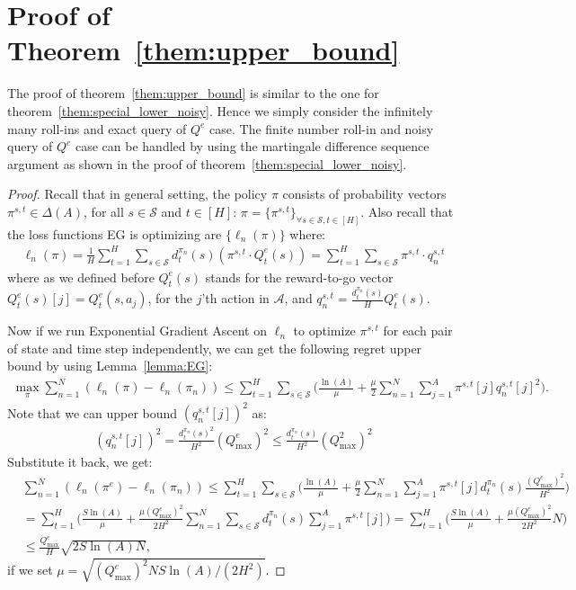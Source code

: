 \documentclass{article}
\begin{document}
\section{Proof of Theorem~\ref{them:upper_bound}}
\label{sec:proof_upper_bound}
The proof of theorem~\ref{them:upper_bound} is similar to the one for theorem~\ref{them:special_lower_noisy}. Hence we simply consider the infinitely many roll-ins and exact query of $Q^e$ case. The finite number roll-in and noisy query of $Q^e$ case can be handled by using the martingale difference sequence argument as shown in the proof of theorem~\ref{them:special_lower_noisy}.

\begin{proof}
Recall that in general setting, the policy $\pi$ consists of probability vectors $\pi^{s,t}\in\Delta(A)$, for all $s\in\mathcal{S}$ and $t\in[H]$: $\pi = \{\pi^{s,t}\}_{\forall s\in \mathcal{S},t\in[H]}$. Also recall that the loss functions EG is optimizing are $\{\ell_n(\pi)\}$ where:
\begin{align}
\ell_n(\pi) = \frac{1}{H}\sum_{t=1}^H\sum_{s\in\mathcal{S}} d_t^{\pi_n}(s) (\pi^{s,t}\cdot Q_t^e(s)) = \sum_{t=1}^H\sum_{s\in\mathcal{S}}\pi^{s,t}\cdot q_n^{s,t}
\end{align} where as we defined before $Q_t^e(s)$ stands for the reward-to-go vector $Q_t^e(s)[j] = Q_t^e(s,a_j)$, for the $j$'th action in $\mathcal{A}$, and $q_n^{s,t} = \frac{d_t^{\pi_n}(s)}{H}Q_t^e(s)$.  


Now if we run Exponential Gradient Ascent on $\ell_n$ to optimize $\pi^{s,t}$ for each pair of state and time step independently, we can get the following regret upper bound by using Lemma~\ref{lemma:EG}:
\begin{align}
\max_{\pi}\sum_{n=1}^N (\ell_n(\pi) - \ell_n(\pi_n)) \leq \sum_{t=1}^H\sum_{s\in\mathcal{S}}\big( \frac{\ln(A)}{\mu} + \frac{\mu}{2}\sum_{n=1}^N\sum_{j=1}^A \pi^{s,t}[j] q_n^{s,t}[j]^2\big).
\end{align} Note that we can upper bound $(q_n^{s,t}[j])^2$ as:
\begin{align}
(q_n^{s,t}[j])^2 = \frac{d_t^{\pi_n}(s)^2}{H^2}(Q^e_{\max})^2 \leq \frac{d_t^{\pi_n}(s)}{H^2} (Q^2_{\max})^2 
\end{align}
Substitute it back, we get:
\begin{align}
&\sum_{n=1}^N (\ell_n(\pi^e) - \ell_n(\pi_n)) \leq \sum_{t=1}^H\sum_{s\in\mathcal{S}} \big(\frac{\ln(A)}{\mu} + \frac{\mu}{2}\sum_{n=1}^N\sum_{j=1}^A \pi^{s,t}[j] d_t^{\pi_n}(s)\frac{(Q^e_{\max})^2}{H^2} \big) \nonumber\\
& = \sum_{t=1}^H \big(\frac{S\ln(A)}{\mu} + \frac{\mu(Q^e_{\max})^2}{2H^2}\sum_{n=1}^N\sum_{s\in\mathcal{S}}d_t^{\pi_n}(s)\sum_{j=1}^A\pi^{s,t}[j]\big) = \sum_{t=1}^H \big( \frac{S\ln(A)}{\mu} + \frac{\mu(Q^e_{\max})^2}{2H^2}N\big) \nonumber\\
& \leq \frac{Q^e_{\max}}{H}\sqrt{2S\ln(A)N},
\end{align} if we set $\mu = \sqrt{(Q^e_{\max})^2NS\ln(A)/(2H^2)}$.


\end{proof}
\end{document}
